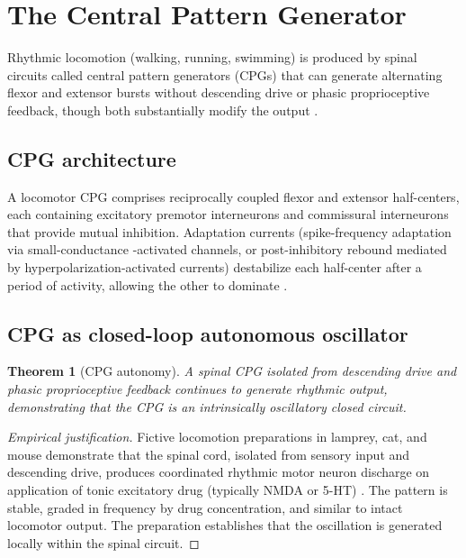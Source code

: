 \documentclass[11pt,twocolumn,a4paper]{article}
\newtheorem{theorem}{Theorem}[section]
\theoremstyle{definition}
\theoremstyle{remark}
\begin{document}
\section{The Central Pattern Generator}
\label{sec:cpg}

Rhythmic locomotion (walking, running, swimming) is produced by spinal
circuits called central pattern generators (CPGs) that can generate
alternating flexor and extensor bursts without descending drive or
phasic proprioceptive feedback, though both substantially modify the
output \citep{grillner1985,grillner2003,marder2001}.

\subsection{CPG architecture}

A locomotor CPG comprises reciprocally coupled flexor and extensor
half-centers, each containing excitatory premotor interneurons and
commissural interneurons that provide mutual inhibition. Adaptation
currents (spike-frequency adaptation via small-conductance
-activated  channels, or post-inhibitory rebound
mediated by hyperpolarization-activated  currents) destabilize
each half-center after a period of activity, allowing the other to
dominate \citep{marder2001,grillner2003}.

\subsection{CPG as closed-loop autonomous oscillator}

\begin{theorem}[CPG autonomy]
\label{thm:cpg}
A spinal CPG isolated from descending drive and phasic proprioceptive
feedback continues to generate rhythmic output, demonstrating that
the CPG is an intrinsically oscillatory closed circuit.
\end{theorem}

\begin{proof}[Empirical justification]
Fictive locomotion preparations in lamprey, cat, and mouse demonstrate
that the spinal cord, isolated from sensory input and descending drive,
produces coordinated rhythmic motor neuron discharge on application of
tonic excitatory drug (typically NMDA or 5-HT) \citep{grillner1985,%
marder2001,kiehn2016}. The pattern is stable, graded in frequency by
drug concentration, and similar to intact locomotor output. The
preparation establishes that the oscillation is generated locally
within the spinal circuit.
\end{proof}
\end{document}
